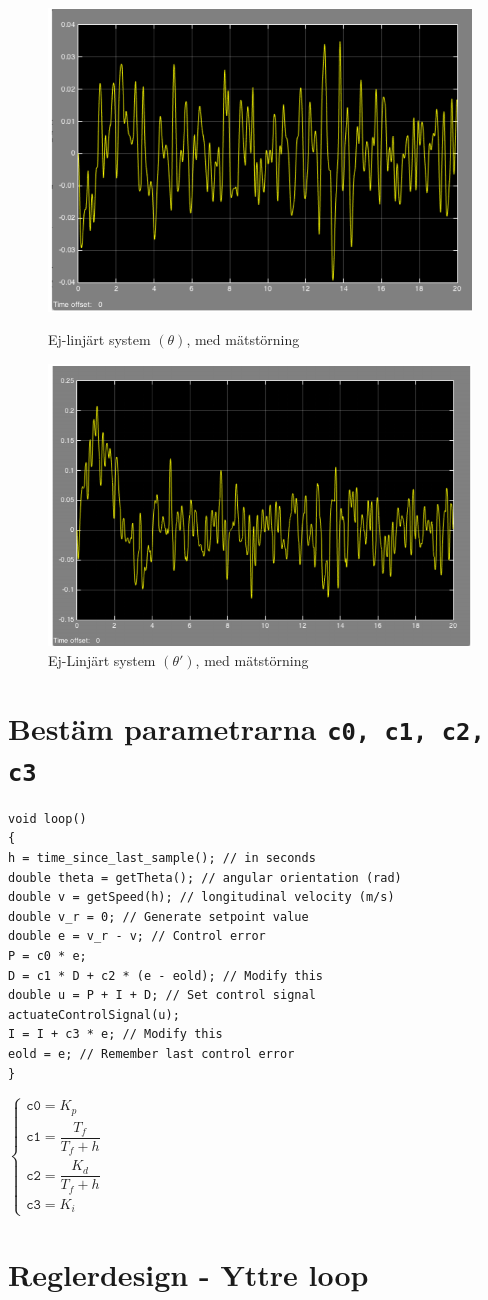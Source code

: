 \documentclass[11pt]{article}
\begin{document}
\begin{figure}[h!]
\centering
\includegraphics[scale=0.9]{Figures/simlink_3}
\caption{Ej-linjärt system $(\theta)$, med mätstörning}
\vspace{3em}
\includegraphics[scale=0.9]{Figures/simlink_4}
\caption{Ej-Linjärt system $(\theta \prime)$, med mätstörning}
\end{figure}
\newpage
\section{Bestäm parametrarna \texttt{c0, c1, c2, c3}}
\begin{lstlisting}[frame=single]
void loop()
{
h = time_since_last_sample(); // in seconds
double theta = getTheta(); // angular orientation (rad)
double v = getSpeed(h); // longitudinal velocity (m/s)
double v_r = 0; // Generate setpoint value
double e = v_r - v; // Control error
P = c0 * e;
D = c1 * D + c2 * (e - eold); // Modify this
double u = P + I + D; // Set control signal
actuateControlSignal(u);
I = I + c3 * e; // Modify this
eold = e; // Remember last control error
}
\end{lstlisting}\vspace*{2em}
$
\begin{cases}
\texttt{c0} = K_p \\[1em]
\texttt{c1} = \dfrac{T_f}{T_f+h}\\[1em]
\texttt{c2} = \dfrac{K_d}{T_f+h} \\[1em]
\texttt{c3} = K_i
\end{cases}
$
\newpage
\section{Reglerdesign - Yttre loop}
\end{document}
